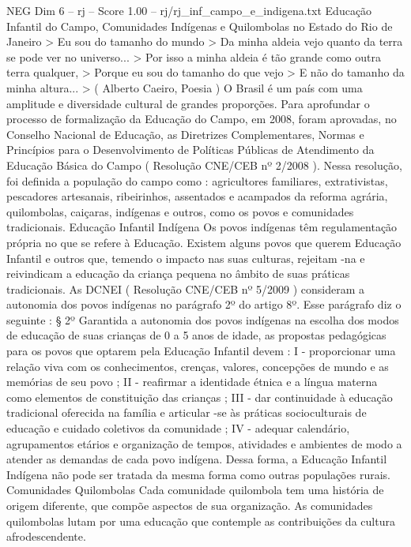\begin{textsample}{NEG Dim 6 – rj – Score 1.00 – rj/rj\_inf\_campo\_e\_indigena.txt}  \label{ex:f6_neg_012}
Educação Infantil do Campo, Comunidades Indígenas e Quilombolas no Estado do Rio de Janeiro > Eu sou do tamanho do mundo > Da minha aldeia vejo quanto da terra se pode ver no universo... > Por isso a minha aldeia é tão grande como outra terra qualquer, > Porque eu sou do tamanho do que vejo > E não do tamanho da minha altura... > ( Alberto Caeiro, Poesia ) O Brasil é um país com uma amplitude e diversidade cultural de grandes proporções.
Para aprofundar o processo de formalização da Educação do Campo, em 2008, foram aprovadas, no Conselho Nacional de Educação, as Diretrizes Complementares, Normas e Princípios para o Desenvolvimento de Políticas Públicas de Atendimento da Educação Básica do Campo ( Resolução CNE/CEB nº 2/2008 ).
Nessa resolução, foi definida a população do campo como : agricultores familiares, extrativistas, pescadores artesanais, ribeirinhos, assentados e acampados da reforma agrária, quilombolas, caiçaras, indígenas e outros, como os povos e comunidades tradicionais.
Educação Infantil Indígena Os povos indígenas têm regulamentação própria no que se refere à Educação.
Existem alguns povos que querem Educação Infantil e outros que, temendo o impacto nas suas culturas, rejeitam -na e reivindicam a educação da criança pequena no âmbito de suas práticas tradicionais.
As DCNEI ( Resolução CNE/CEB nº 5/2009 ) consideram a autonomia dos povos indígenas no parágrafo 2º do artigo 8º.
Esse parágrafo diz o seguinte : § 2º Garantida a autonomia dos povos indígenas na escolha dos modos de educação de suas crianças de 0 a 5 anos de idade, as propostas pedagógicas para os povos que optarem pela Educação Infantil devem : I - proporcionar uma relação viva com os conhecimentos, crenças, valores, concepções de mundo e as memórias de seu povo ; II - reafirmar a identidade étnica e a língua materna como elementos de constituição das crianças ; III - dar continuidade à educação tradicional oferecida na família e articular -se às práticas socioculturais de educação e cuidado coletivos da comunidade ; IV - adequar calendário, agrupamentos etários e organização de tempos, atividades e ambientes de modo a atender as demandas de cada povo indígena.
Dessa forma, a Educação Infantil Indígena não pode ser tratada da mesma forma como outras populações rurais.
Comunidades Quilombolas Cada comunidade quilombola tem uma história de origem diferente, que compõe aspectos de sua organização.
As comunidades quilombolas lutam por uma educação que contemple as contribuições da cultura afrodescendente.

\end{textsample}
